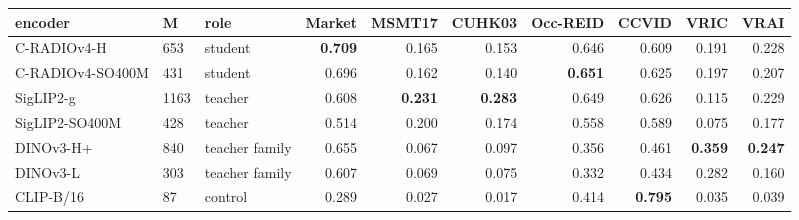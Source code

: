 \begin{tabular}{lllrrrrrrr}
\toprule
encoder & M & role & Market & MSMT17 & CUHK03 & Occ-REID & CCVID & VRIC & VRAI \\
\midrule
C-RADIOv4-H & 653 & student & \textbf{0.709} & 0.165 & 0.153 & 0.646 & 0.609 & 0.191 & 0.228 \\
C-RADIOv4-SO400M & 431 & student & 0.696 & 0.162 & 0.140 & \textbf{0.651} & 0.625 & 0.197 & 0.207 \\
\midrule
SigLIP2-g & 1163 & teacher & 0.608 & \textbf{0.231} & \textbf{0.283} & 0.649 & 0.626 & 0.115 & 0.229 \\
SigLIP2-SO400M & 428 & teacher & 0.514 & 0.200 & 0.174 & 0.558 & 0.589 & 0.075 & 0.177 \\
\midrule
DINOv3-H+ & 840 & teacher family & 0.655 & 0.067 & 0.097 & 0.356 & 0.461 & \textbf{0.359} & \textbf{0.247} \\
DINOv3-L & 303 & teacher family & 0.607 & 0.069 & 0.075 & 0.332 & 0.434 & 0.282 & 0.160 \\
\midrule
CLIP-B/16 & 87 & control & 0.289 & 0.027 & 0.017 & 0.414 & \textbf{0.795} & 0.035 & 0.039 \\
\bottomrule
\end{tabular}
